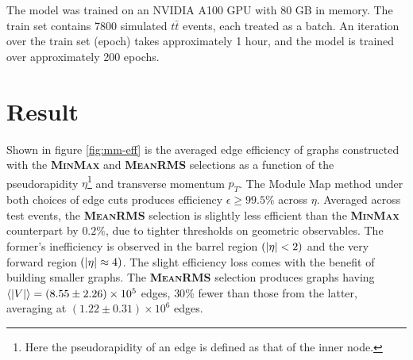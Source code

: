 \newpage


The model was trained on an NVIDIA A100 GPU with 80 GB in memory. 
The train set contains 7800 simulated $t\bar{t}$ events, each treated as a batch. 
An iteration over the train set (epoch) takes approximately 1 hour, and the model is trained over approximately 200 epochs. 

\section{Result}
\label{sect:graph-contruction-performance}

Shown in figure \ref{fig:mm-eff} is the averaged edge efficiency of graphs constructed with the \textbf{\textsc{MinMax}} and \textbf{\textsc{MeanRMS}} selections as a function of the pseudorapidity $\eta$\footnote{Here the pseudorapidity of an edge is defined as that of the inner node.} and transverse momentum $p_T$. 
The Module Map method under both choices of edge cuts produces efficiency $\epsilon\ge 99.5\%$ across $\eta$. 
Averaged across test events, the \textbf{\textsc{MeanRMS}} selection is slightly less efficient than the \textbf{\textsc{MinMax}} counterpart by $0.2\%$, due to tighter thresholds on geometric observables. 
The former's inefficiency is observed in the barrel region $(\abs{\eta}<2)$ and the very forward region $(\abs{\eta} \approx 4)$.
The slight efficiency loss comes with the benefit of building smaller graphs.
The \textbf{\textsc{MeanRMS}} selection produces graphs having $\expval{|V|} = (8.55\pm2.26)\times10^5$ edges, $30\%$ fewer than those from the latter, averaging at $(1.22\pm0.31)\times10^6$ edges.

